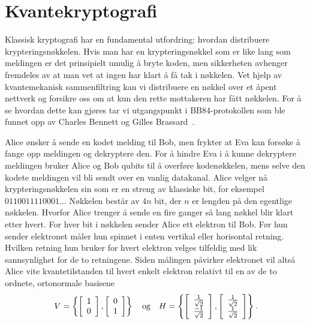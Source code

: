 \chapter{Kvantekryptografi}

Klassisk kryptografi har en fundamental utfordring: hvordan distribuere krypteringsnøkkelen. Hvis man har en krypteringsnøkkel som er like lang som meldingen er det prinsipielt umulig å bryte koden, men sikkerheten avhenger fremdeles av at man vet at ingen har klart å få tak i nøkkelen. Vet hjelp av kvantemekanisk sammenfiltring kan vi distribuere en nøkkel over et åpent nettverk og forsikre oss om at kun den rette mottakeren har fått nøkkelen. For å se hvordan dette kan gjøres tar vi utgangspunkt i BB84-protokollen som ble funnet opp av Charles Bennett og Gilles Brassard~\cite{bb84}.

Alice ønsker å sende en kodet melding til Bob, men frykter at Eva kan forsøke å fange opp meldingen og dekryptere den. For å hindre Eva i å kunne dekryptere meldingen bruker Alice og Bob qubits til å overføre kodenøkkelen, mens selve den kodete meldingen vil bli sendt over en vanlig datakanal. Alice velger nå krypteringsnøkkelen sin som er en streng av klassiske bit, for eksempel $0110011110001\ldots$ Nøkkelen består av $4n$ bit, der $n$ er lengden på den egentlige nøkkelen. Hvorfor Alice trenger å sende en fire ganger så lang nøkkel blir klart etter hvert. For hver bit i nøkkelen sender Alice ett elektron til Bob. Før hun sender elektronet måler hun spinnet i enten vertikal eller horisontal retning. Hvilken retning hun bruker for hvert elektron velges tilfeldig med lik sannsynlighet for de to retningene. Siden målingen påvirker elektronet vil altså Alice vite kvantetilstanden til hvert enkelt elektron relativt til en av de to ordnete, ortonormale basisene
\begin{displaymath}
	V = \left\{ \left[\begin{array}{c}1\\0\end{array}\right], \left[\begin{array}{c}0\\1\end{array}\right] \right\} 
	\quad \text{og} \quad 
	H = \left\{ \left[\begin{array}{c}\frac{1}{\sqrt{2}}\\ \frac{-1}{\sqrt{2}}\end{array}\right], \left[\begin{array}{c}\frac{1}{\sqrt{2}}\\ \frac{1}{\sqrt{2}}\end{array}\right] \right\}.
\end{displaymath}
